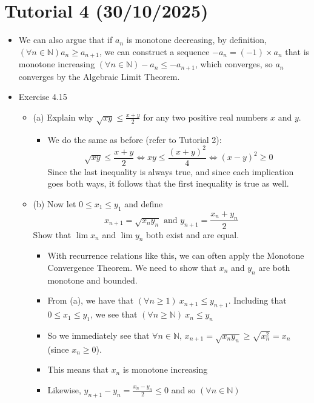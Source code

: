 \documentclass{article}
\begin{document}
\section{Tutorial 4 (30/10/2025)}
\begin{itemize}
    \item We can also argue that if $a_n$ is monotone decreasing, by definition, $(\forall n \in \mathbb{N}) a_n \ge a_{n+1}$, we can construct a sequence $-a_n = (-1) \times a_n$ that is monotone increasing $(\forall n \in \mathbb{N}) -a_n \le -a_{n+1}$, which converges, so $a_n$ converges by the Algebraic Limit Theorem.
    \item Exercise 4.15
    \begin{itemize}
        \item (a) Explain why $\sqrt{xy} \le \frac{x+y}{2}$ for any two positive real numbers $x$ and $y$.
        \begin{itemize}
            \item We do the same as before (refer to Tutorial 2):
            \[
            \sqrt{xy} \le \frac{x+y}{2} \Longleftrightarrow xy \le \frac{(x+y)^2}{4} \Longleftrightarrow (x-y)^2 \ge 0
            \]
            Since the last inequality is always true, and since each implication goes both ways, it follows that the first inequality is true as well.
        \end{itemize}
        \item (b) Now let $0 \le x_1 \le y_1$ and define
        \[
        x_{n+1} = \sqrt{x_ny_n} \text{ and } y_{n+1} = \frac{x_n+y_n}{2}
        \]
        Show that $\lim x_n$ and $\lim y_n$ both exist and are equal.
        \begin{itemize}
            \item With recurrence relations like this, we can often apply the Monotone Convergence Theorem. We need to show that $x_n$ and $y_n$ are both monotone and bounded.
            \item From (a), we have that $(\forall n \ge 1) \ x_{n+1} \le y_{n+1}$. Including that $0 \le x_1 \le y_1$, we see that $(\forall n \ge \mathbb{N}) \ x_n \le y_n$
            \item So we immediately see that $\forall n \in \mathbb{N}$, $x_{n+1} = \sqrt{x_ny_n} \ge \sqrt{x_n^2} = x_n$ (since $x_n \ge 0$).
            \item This means that $x_n$ is monotone increasing
            \item Likewise, $y_{n+1} - y_n = \frac{x_n - y_n}{2} \le 0$ and so $(\forall n \in \mathbb{N})$

\end{itemize}
\end{itemize}
\end{itemize}
\end{document}
